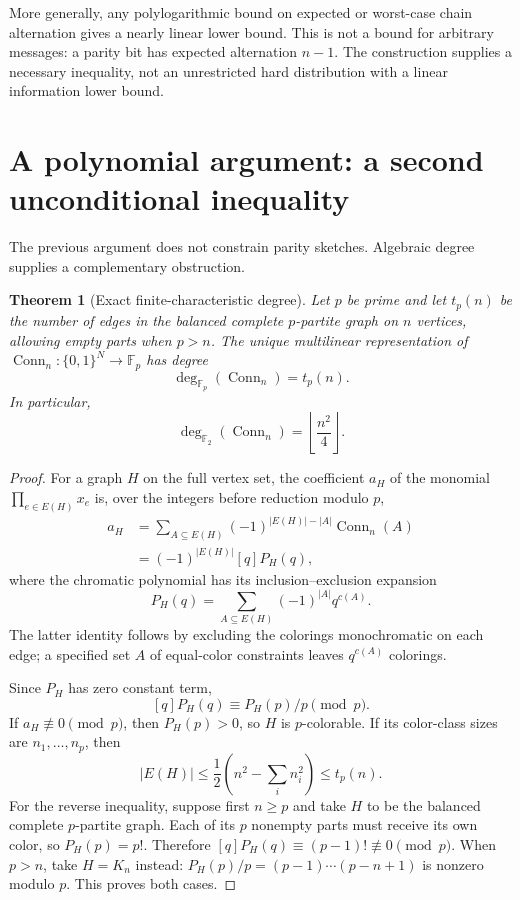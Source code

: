 \documentclass[11pt]{article}
\newtheorem{theorem}{Theorem}[section]
\theoremstyle{definition}\newtheorem{definition}[theorem]{Definition}
\theoremstyle{remark}\newtheorem{remark}[theorem]{Remark}
\newcommand{\F}{\mathbb F}
\newcommand{\Conn}{\operatorname{Conn}}
\newcommand{\bin}[1]{\{0,1\}^{#1}}
\begin{document}
More generally, any polylogarithmic bound on expected or worst-case chain alternation gives a nearly linear lower bound. This is not a bound for arbitrary messages: a parity bit has expected alternation $n-1$. The construction supplies a necessary inequality, not an unrestricted hard distribution with a linear information lower bound.

\section{A polynomial argument: a second unconditional inequality}
The previous argument does not constrain parity sketches. Algebraic degree supplies a complementary obstruction.

\begin{theorem}[Exact finite-characteristic degree]\label{thm:degree}
Let $p$ be prime and let $t_p(n)$ be the number of edges in the balanced complete $p$-partite graph on $n$ vertices, allowing empty parts when $p>n$. The unique multilinear representation of $\Conn_n:\bin{N}\to\F_p$ has degree
\[
 \deg_{\F_p}(\Conn_n)=t_p(n).
\]
In particular,
\[
 \deg_{\F_2}(\Conn_n)=\left\lfloor\frac{n^2}{4}\right\rfloor.
\]
\end{theorem}
\begin{proof}
For a graph $H$ on the full vertex set, the coefficient $a_H$ of the monomial $\prod_{e\in E(H)}x_e$ is, over the integers before reduction modulo $p$,
\begin{align*}
 a_H
 &=\sum_{A\subseteq E(H)}(-1)^{|E(H)|-|A|}\Conn_n(A)\\
 &=(-1)^{|E(H)|}[q]P_H(q),
\end{align*}
where the chromatic polynomial has its inclusion--exclusion expansion
\[
 P_H(q)=\sum_{A\subseteq E(H)}(-1)^{|A|}q^{c(A)}.
\]
The latter identity follows by excluding the colorings monochromatic on each edge; a specified set $A$ of equal-color constraints leaves $q^{c(A)}$ colorings.

Since $P_H$ has zero constant term,
\[
 [q]P_H(q)\equiv P_H(p)/p\pmod p.
\]
If $a_H\not\equiv0\pmod p$, then $P_H(p)>0$, so $H$ is $p$-colorable. If its color-class sizes are $n_1,\ldots,n_p$, then
\[
 |E(H)|\le\frac12\left(n^2-\sum_i n_i^2\right)\le t_p(n).
\]
For the reverse inequality, suppose first $n\ge p$ and take $H$ to be the balanced complete $p$-partite graph. Each of its $p$ nonempty parts must receive its own color, so $P_H(p)=p!$. Therefore $[q]P_H(q)\equiv(p-1)!\not\equiv0\pmod p$. When $p>n$, take $H=K_n$ instead: $P_H(p)/p=(p-1)\cdots(p-n+1)$ is nonzero modulo $p$. This proves both cases.
\end{proof}
\end{document}

